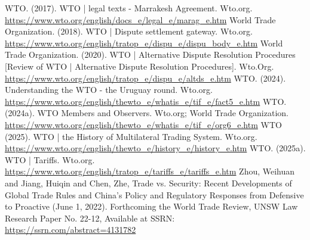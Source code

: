 \begin{referencelist}
   WTO. (2017). WTO | legal texts - Marrakesh Agreement. Wto.org. \url{https://www.wto.org/english/docs_e/legal_e/marag_e.htm}
   World Trade Organization. (2018). WTO | Dispute settlement gateway. Wto.org. \url{https://www.wto.org/english/tratop_e/dispu_e/dispu_body_e.htm}
   World Trade Organization. (2020). WTO | Alternative Dispute Resolution Procedures [Review of WTO | Alternative Dispute Resolution Procedures]. Wto.Org. \url{https://www.wto.org/english/tratop_e/dispu_e/altds_e.htm}
   WTO. (2024). Understanding the WTO - the Uruguay round. Wto.org. \url{https://www.wto.org/english/thewto_e/whatis_e/tif_e/fact5_e.htm}
   WTO. (2024a). WTO Members and Observers. Wto.org; World Trade Organization. \url{https://www.wto.org/english/thewto_e/whatis_e/tif_e/org6_e.htm}
   WTO (2025). WTO | the History of Multilateral Trading System. Wto.org. \url{https://www.wto.org/english/thewto_e/history_e/history_e.htm}
   WTO. (2025a). WTO | Tariffs. Wto.org. \url{https://www.wto.org/english/tratop_e/tariffs_e/tariffs_e.htm} Zhou, Weihuan and Jiang, Huiqin and Chen, Zhe, Trade vs. Security: Recent Developments of Global Trade Rules and China's Policy and Regulatory Responses from Defensive to Proactive (June 1, 2022). Forthcoming the World Trade Review, UNSW Law Research Paper No. 22-12, Available at SSRN: \url{https://ssrn.com/abstract=4131782}
\end{referencelist}
